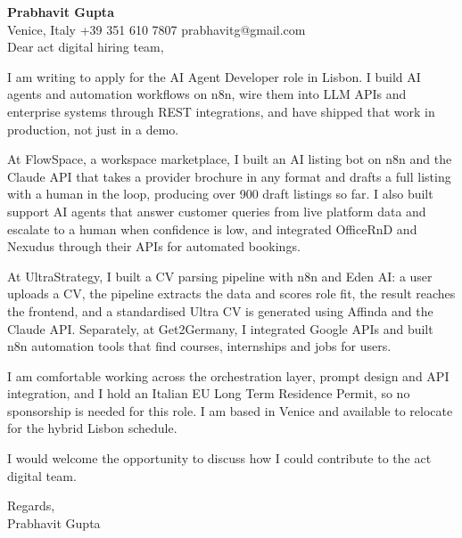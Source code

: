 \documentclass[a4paper,10.5pt]{article}
\begin{document}
\textbf{Prabhavit Gupta}\\
Venice, Italy \textbar{} +39 351 610 7807 \textbar{} prabhavitg@gmail.com\\[10pt]
Dear act digital hiring team,

I am writing to apply for the AI Agent Developer role in Lisbon. I build AI agents and automation workflows on n8n, wire them into LLM APIs and enterprise systems through REST integrations, and have shipped that work in production, not just in a demo.

At FlowSpace, a workspace marketplace, I built an AI listing bot on n8n and the Claude API that takes a provider brochure in any format and drafts a full listing with a human in the loop, producing over 900 draft listings so far. I also built support AI agents that answer customer queries from live platform data and escalate to a human when confidence is low, and integrated OfficeRnD and Nexudus through their APIs for automated bookings.

At UltraStrategy, I built a CV parsing pipeline with n8n and Eden AI: a user uploads a CV, the pipeline extracts the data and scores role fit, the result reaches the frontend, and a standardised Ultra CV is generated using Affinda and the Claude API. Separately, at Get2Germany, I integrated Google APIs and built n8n automation tools that find courses, internships and jobs for users.

I am comfortable working across the orchestration layer, prompt design and API integration, and I hold an Italian EU Long Term Residence Permit, so no sponsorship is needed for this role. I am based in Venice and available to relocate for the hybrid Lisbon schedule.

I would welcome the opportunity to discuss how I could contribute to the act digital team.

Regards,\\
Prabhavit Gupta
\end{document}
